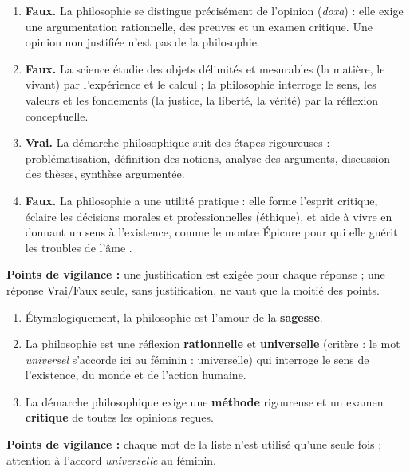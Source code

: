 \documentclass[11pt]{article}
\begin{document}
\begin{corrige}
\begin{enumerate}
\item \textbf{Faux.} La philosophie se distingue précisément de l'opinion (\emph{doxa}) : elle exige une argumentation rationnelle, des preuves et un examen critique. Une opinion non justifiée n'est pas de la philosophie.
\item \textbf{Faux.} La science étudie des objets délimités et mesurables (la matière, le vivant) par l'expérience et le calcul ; la philosophie interroge le sens, les valeurs et les fondements (la justice, la liberté, la vérité) par la réflexion conceptuelle.
\item \textbf{Vrai.} La démarche philosophique suit des étapes rigoureuses : problématisation, définition des notions, analyse des arguments, discussion des thèses, synthèse argumentée.
\item \textbf{Faux.} La philosophie a une utilité pratique : elle forme l'esprit critique, éclaire les décisions morales et professionnelles (éthique), et aide à vivre en donnant un sens à l'existence, comme le montre Épicure pour qui elle \og guérit les troubles de l'âme \fg{}.
\end{enumerate}
\textbf{Points de vigilance :} une justification est exigée pour chaque réponse ; une réponse \og Vrai/Faux \fg{} seule, sans justification, ne vaut que la moitié des points.
\end{corrige}

\begin{corrige}
\begin{enumerate}
\item Étymologiquement, la philosophie est l'amour de la \textbf{sagesse}.
\item La philosophie est une réflexion \textbf{rationnelle} et \textbf{universelle} (critère : le mot \emph{universel} s'accorde ici au féminin : universelle) qui interroge le sens de l'existence, du monde et de l'action humaine.
\item La démarche philosophique exige une \textbf{méthode} rigoureuse et un examen \textbf{critique} de toutes les opinions reçues.
\end{enumerate}
\textbf{Points de vigilance :} chaque mot de la liste n'est utilisé qu'une seule fois ; attention à l'accord \emph{universelle} au féminin.
\end{corrige}
\end{document}

